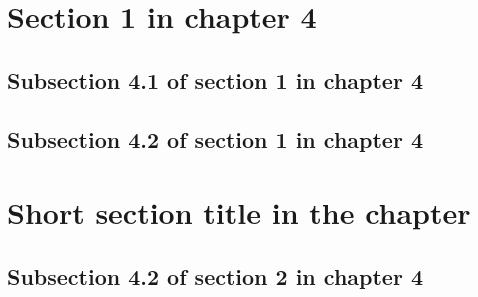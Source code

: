 \section{Section 1 in chapter 4}
\lipsum[2-4]

\subsection{Subsection 4.1 of section 1 in chapter 4}
\lipsum[5-7]

\subsection{Subsection 4.2 of section 1 in chapter 4}
\lipsum[8-11]

\clearpage{} %
\section[Long section title displayed in the table of content]{Short section title in the chapter}
\lipsum[11-20]

\subsection{Subsection 4.2 of section 2 in chapter 4}
\lipsum[13-14]


{}
\specialsection %
\headerspecialsection

{\hypersetup{urlcolor=ntnu,linkcolor=sophia} %


}
